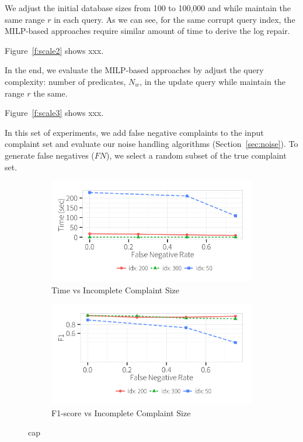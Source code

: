 We adjust the initial database sizes from 100 to 100,000 and 
while maintain the same range $r$ in each query. As we can see, 
for the same corrupt query index, the MILP-based approaches require
similar amount of time to derive the log repair. 

Figure~\ref{f:scale2} shows xxx.



In the end, we evaluate the MILP-based approaches by adjust 
the query complexity: number of predicates, $N_w$, in the 
update query while maintain the range $r$ the same. 

Figure~\ref{f:scale3} shows xxx.


In this set of experiments, we add false negative complaints to the input
complaint set and evaluate our noise handling algorithms (Section~\ref{sec:noise}).
To generate false negatives ($FN$), we select a random subset of the true complaint set.


  \begin{figure}[h!]
    \centering
    \begin{subfigure}[t]{\columnwidth}
    \includegraphics[width = .9\columnwidth]{figures/noise_fn_time}
    \caption{Time vs Incomplete Complaint Size}
    \label{f:falsenegative_time} 
    \end{subfigure}
    \begin{subfigure}[t]{\columnwidth}
    \includegraphics[width = .9\columnwidth]{figures/noise_fn_acc}
    \caption{F1-score vs Incomplete Complaint Size}
    \label{f:falsenegative_acc} 
    \end{subfigure}
    \caption{cap}
  \end{figure}

